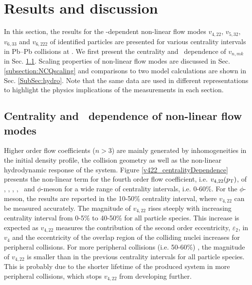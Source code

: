\newpage

\section{Results and discussion}
\label{Sec:Results}

In this section, the results for the \pT-dependent non-linear flow modes $v_{4,22}$, $v_{5,32}$, $v_{6,33}$ and $v_{6,222}$ of identified particles are presented for various centrality intervals in Pb--Pb collisions at \sNN. We first present the centrality and \pT~dependence of $v_{n,mk}$ in Sec. \ref{SubSec:pTdependence}. Scaling properties of non-linear flow modes are discussed in Sec. \ref{subsection:NCQscaling} and comparisons to two model calculations are shown in Sec. \ref{SubSec:hydro}. Note that the same data are used in different representations to highlight the physics implications of the measurements in each section. 

\subsection{Centrality and \pT~dependence of non-linear flow modes}
\label{SubSec:pTdependence}

Higher order flow coefficients ($n>3$) are mainly generated by inhomogeneities in the initial density profile, the collision geometry as well as the non-linear hydrodynamic response of the system. Figure \ref{v422_centralityDependence} presents the non-linear term for the fourth order flow coefficient, i.e. $v_{4,22}(p_{\rm{T}})$, of \pion, \kaon, \proton, \lambdas, \Ks~and $\phi$-meson for a wide range of centrality intervals, i.e. 0-60\%. For the $\phi$-meson, the results are reported in the 10-50\% centrality interval, where $v_{4,22}$ can be measured accurately. The magnitude of $v_{4,22}$ rises steeply with increasing centrality interval from 0-5\% to 40-50\% for all particle species. This increase is expected as $v_{4,22}$ measures the contribution of the second order eccentricity, $\varepsilon_{2}$, in $v_{4}$ and the eccentricity of
the overlap region of the colliding nuclei increases for peripheral collisions. For more peripheral collisions (i.e. 50-60\%) , the magnitude of $v_{4,22}$ is smaller than in the previous centrality intervals for all particle species. This is probably due to the shorter lifetime of the produced system in more peripheral collisions, which stops $v_{4,22}$ from developing further. 


